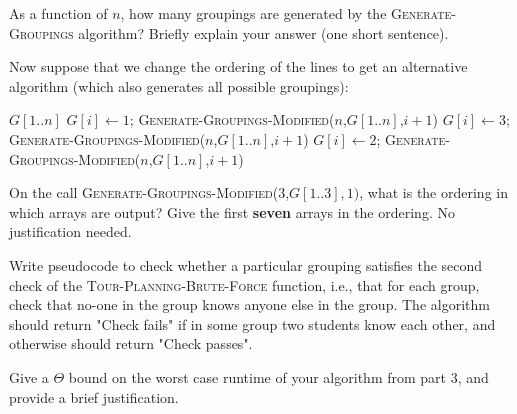 \documentclass[11pt,fleqn]{exam}
\newif\ifsolutions\solutionsfalse
\begin{document}
\begin{questions}
  \question[2]
  As a function of $n$, how many groupings are generated by the \textsc{Generate-Groupings} algorithm? Briefly explain your answer (one short sentence).

  \ifsolutions
    
  \fi

  \question[3]
  Now suppose that we change the ordering of the lines to get an alternative algorithm (which also generates all possible groupings):

  \begin{algorithmic}
    \Return $G[1..n]$
    \Else
    \State $G[i] \gets 1$; \textsc{Generate-Groupings-Modified}($n$,$G[1..n]$,$i+1$)
    \State $G[i] \gets 3$; \textsc{Generate-Groupings-Modified}($n$,$G[1..n]$,$i+1$)
    \State $G[i] \gets 2$; \textsc{Generate-Groupings-Modified}($n$,$G[1..n]$,$i+1$)
    \EndIf
    \EndFunction
  \end{algorithmic}
  On the call \textsc{Generate-Groupings-Modified}(3,$G[1..3],1)$,
    what is the ordering in which arrays are output?
    Give the first {\bf seven} arrays in the ordering. No justification needed.

    \ifsolutions
      
    \fi

    \question[4]
    Write pseudocode to check whether a particular grouping satisfies the second check of the \textsc{Tour-Planning-Brute-Force} function, i.e., that for each group, check that no-one in the group knows anyone else in the group. The algorithm should return "Check fails" if in some group two students know each other, and otherwise should return "Check passes".

    \ifsolutions
      
    \else
      \begin{algorithmic}
        \State
        \State
        \EndFunction
      \end{algorithmic}
    \fi
    \question[2]
    Give a $\Theta$ bound on the worst case runtime of your algorithm from part 3, and provide a brief justification.

  \ifsolutions
    
  \fi
\end{questions}
\end{document}
